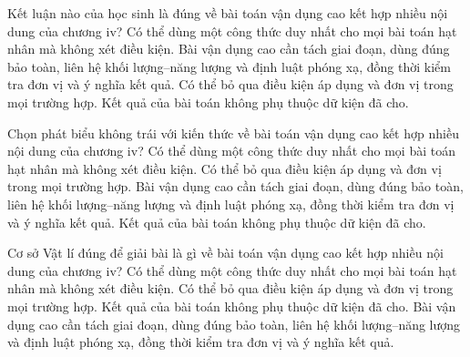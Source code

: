 \begin{ex}
Kết luận nào của học sinh là đúng về bài toán vận dụng cao kết hợp nhiều nội dung của chương iv?
\choice
{Có thể dùng một công thức duy nhất cho mọi bài toán hạt nhân mà không xét điều kiện.}
{\True Bài vận dụng cao cần tách giai đoạn, dùng đúng bảo toàn, liên hệ khối lượng–năng lượng và định luật phóng xạ, đồng thời kiểm tra đơn vị và ý nghĩa kết quả.}
{Có thể bỏ qua điều kiện áp dụng và đơn vị trong mọi trường hợp.}
{Kết quả của bài toán không phụ thuộc dữ kiện đã cho.}
\end{ex}

\begin{ex}
Chọn phát biểu không trái với kiến thức về bài toán vận dụng cao kết hợp nhiều nội dung của chương iv?
\choice
{Có thể dùng một công thức duy nhất cho mọi bài toán hạt nhân mà không xét điều kiện.}
{Có thể bỏ qua điều kiện áp dụng và đơn vị trong mọi trường hợp.}
{\True Bài vận dụng cao cần tách giai đoạn, dùng đúng bảo toàn, liên hệ khối lượng–năng lượng và định luật phóng xạ, đồng thời kiểm tra đơn vị và ý nghĩa kết quả.}
{Kết quả của bài toán không phụ thuộc dữ kiện đã cho.}
\end{ex}

\begin{ex}
Cơ sở Vật lí đúng để giải bài là gì về bài toán vận dụng cao kết hợp nhiều nội dung của chương iv?
\choice
{Có thể dùng một công thức duy nhất cho mọi bài toán hạt nhân mà không xét điều kiện.}
{Có thể bỏ qua điều kiện áp dụng và đơn vị trong mọi trường hợp.}
{Kết quả của bài toán không phụ thuộc dữ kiện đã cho.}
{\True Bài vận dụng cao cần tách giai đoạn, dùng đúng bảo toàn, liên hệ khối lượng–năng lượng và định luật phóng xạ, đồng thời kiểm tra đơn vị và ý nghĩa kết quả.}
\end{ex}

